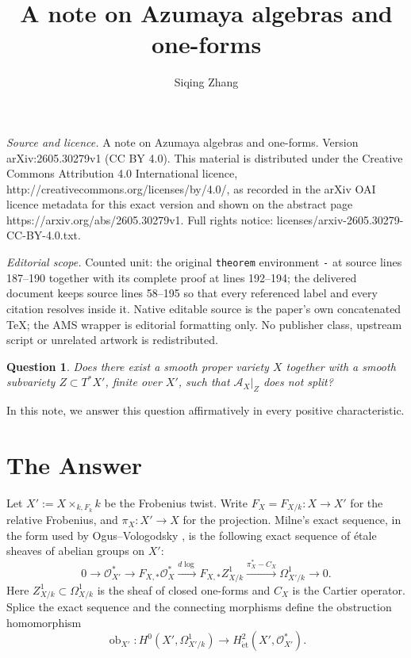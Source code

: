 \documentclass[10pt,a4paper]{amsart}
\newtheorem{question}[theorem]{Question}
\begin{document}
\title[A note on Azumaya algebras and one-forms]{A note on Azumaya algebras and one-forms}
\author{Siqing Zhang}
\date{}
\maketitle
\noindent\emph{Source and licence.} A note on Azumaya algebras and one-forms. Version arXiv:2605.30279v1 (CC BY 4.0). This material is distributed under the Creative Commons Attribution 4.0 International licence, http://creativecommons.org/licenses/by/4.0/, as recorded in the arXiv OAI licence metadata for this exact version and shown on the abstract page https://arxiv.org/abs/2605.30279v1. Full rights notice: licenses/arxiv-2605.30279-CC-BY-4.0.txt.\par\smallskip
\noindent\textit{Editorial scope.} Counted unit: the original \texttt{theorem} environment \texttt{-} at source lines 187--190 together with its complete proof at lines 192--194; the delivered document keeps source lines 58--195 so that every referenced label and every citation resolves inside it. Native editable source is the paper's own concatenated TeX; the AMS wrapper is editorial formatting only. No publisher class, upstream script or unrelated artwork is redistributed.
\begin{question}\cite[Question 7.3(1)]{Petrov}\label{petrov-question}
Does there exist a smooth proper variety \(X\) together with a smooth
subvariety \(Z\subset T^*X'\), finite over \(X'\), such that
\(\mathcal A_X|_Z\) does not split?
\end{question}

In this note, we answer this question affirmatively in every positive characteristic.

\section{The Answer}

 Let
\(
X' := X\times_{k,F_k} k
\)
be the Frobenius twist.
Write \(F_X=F_{X/k}\colon X\to X'\) for the relative
Frobenius, and \(\pi_X\colon X'\to X\) for the projection.
Milne's exact sequence, in the form used by Ogus--Vologodsky
\cite[(4.1.1)]{OV}, is the following exact sequence of \'{e}tale sheaves of
abelian groups on \(X'\):
\begin{equation}\label{eq:milne}
0\longrightarrow \mathcal O_{X'}^*
\longrightarrow F_{X,*}\mathcal O_X^*
\xrightarrow{d\log}
F_{X,*}Z^1_{X/k}
\xrightarrow{\pi_X^*-C_X}
\Omega^1_{X'/k}
\longrightarrow 0.
\end{equation}
Here \(Z^1_{X/k}\subset \Omega^1_{X/k}\) is the sheaf of closed one-forms and
\(C_X\) is the Cartier operator.  Splice the exact sequence and the connecting morphisms define the obstruction homomorphism
\begin{equation}\label{eq:obstruction}
\operatorname{ob}_{X'}\colon
H^0(X',\Omega^1_{X'/k})
\to
H^2_{\mathrm{\acute et}}(X',\mathcal O_{X'}^*).
\end{equation}
\end{document}
